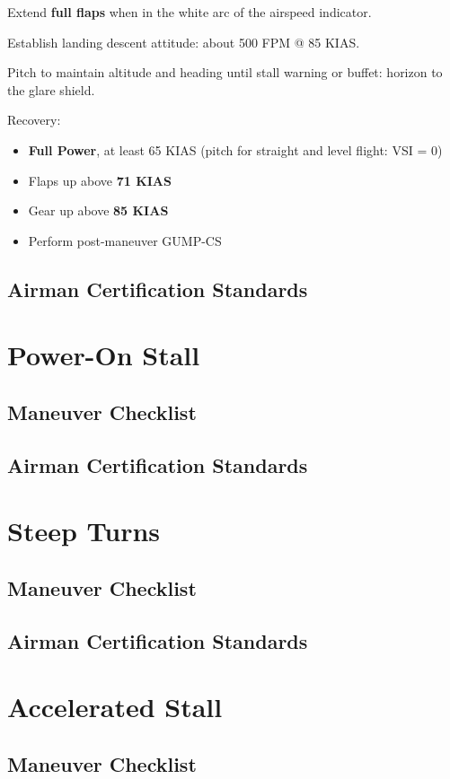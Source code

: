 {Extend \textbf{full flaps} when in the white arc of the airspeed indicator.

Establish landing descent attitude: about 500 FPM @ 85 KIAS.

Pitch to maintain altitude and heading until stall warning or buffet: horizon to the glare shield.

Recovery:
\begin{itemize}[label={}]
\item \textbf{Full Power}, at least 65 KIAS (pitch for straight and level flight: VSI = 0)
\item Flaps up above \textbf{71 KIAS}
\item Gear up above \textbf{85 KIAS}
\item Perform post-maneuver GUMP-CS
\end{itemize}

\subsection{Airman Certification Standards}
\newpage

\section{Power-On Stall}
\subsection{Maneuver Checklist}
\subsection{Airman Certification Standards}
\newpage

\section{Steep Turns}
\subsection{Maneuver Checklist}
\subsection{Airman Certification Standards}
\newpage

\section{Accelerated Stall}
\subsection{Maneuver Checklist}
}
